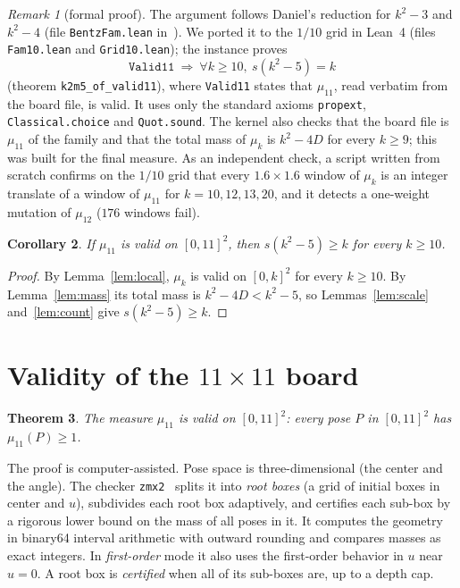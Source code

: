 \documentclass[11pt]{amsart}
\newtheorem{theorem}{Theorem}
\newtheorem{corollary}[theorem]{Corollary}
\theoremstyle{definition}
\theoremstyle{remark}
\newtheorem{remark}[theorem]{Remark}
\begin{document}
\begin{remark}[formal proof]\label{rem:lean}
The argument follows Daniel's reduction for $k^2-3$ and $k^2-4$ (file \texttt{BentzFam.lean} in~\cite{daniel}). We
ported it to the $1/10$ grid in Lean~4 (files \texttt{Fam10.lean} and \texttt{Grid10.lean}); the instance proves
\[
\texttt{Valid11}\ \Longrightarrow\ \forall k\ge10,\ s(k^2-5)=k
\]
(theorem \texttt{k2m5\_of\_valid11}), where \texttt{Valid11} states that $\mu_{11}$, read verbatim from the board
file, is valid. It uses only the standard axioms \texttt{propext}, \texttt{Classical.choice} and \texttt{Quot.sound}.
The kernel also checks that the board file is $\mu_{11}$ of the family and that the total mass of $\mu_k$ is
$k^2-4D$ for every $k\ge9$; this was built for the final measure.
As an independent check, a script written from scratch confirms on the $1/10$ grid that every $1.6\times1.6$ window
of $\mu_k$ is an integer translate of a window of $\mu_{11}$ for $k=10,12,13,20$, and it detects a one-weight
mutation of $\mu_{12}$ ($176$ windows fail).
\end{remark}

\begin{corollary}\label{cor:reduce}
If $\mu_{11}$ is valid on $[0,11]^2$, then $s(k^2-5)\ge k$ for every $k\ge10$.
\end{corollary}

\begin{proof}
By Lemma~\ref{lem:local}, $\mu_k$ is valid on $[0,k]^2$ for every $k\ge10$. By Lemma~\ref{lem:mass} its total mass
is $k^2-4D<k^2-5$, so Lemmas~\ref{lem:scale} and~\ref{lem:count} give $s(k^2-5)\ge k$.
\end{proof}

\section{Validity of the $11\times11$ board}\label{sec:valid}

\begin{theorem}\label{thm:valid}
The measure $\mu_{11}$ is valid on $[0,11]^2$: every pose $P$ in $[0,11]^2$ has $\mu_{11}(P)\ge1$.
\end{theorem}

The proof is computer-assisted. Pose space is three-dimensional (the center and the angle). The checker
\texttt{zmx2}~\cite{daniel} splits it into \emph{root boxes} (a grid of initial boxes in center and $u$), subdivides
each root box adaptively, and certifies each sub-box by a rigorous lower bound on the mass of all poses in it. It
computes the geometry in binary64 interval arithmetic with outward rounding and compares masses as exact integers.
In \emph{first-order} mode it also uses the first-order behavior in $u$ near $u=0$. A root box is
\emph{certified} when all of its sub-boxes are, up to a depth cap.
\end{document}
